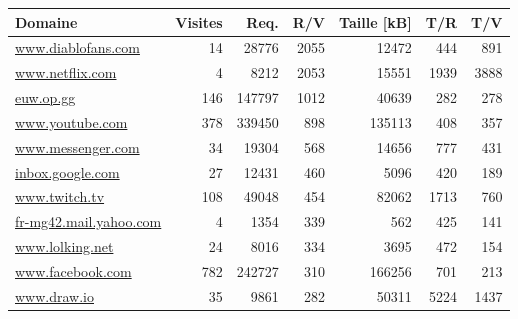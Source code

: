 \begin{table}[h]
\centering
\begin{tabular}{lrrrrrr}
\textbf{Domaine}          & \textbf{Visites} & \textbf{Req.} & \textbf{R/V} & \textbf{Taille [kB]} & \textbf{T/R} & \textbf{T/V} \\ \hline
\scriptsize \url{www.diablofans.com}        & 14             & 28776         & 2055                           & 12472         & 444                     & 891                       \\
\scriptsize \url{www.netflix.com}           & 4              & 8212          & 2053                           & 15551         & 1939                    & 3888                      \\
\scriptsize \url{euw.op.gg}                 & 146            & 147797        & 1012                           & 40639         & 282                     & 278                       \\
\scriptsize \url{www.youtube.com}           & 378            & 339450        & 898                            & 135113        & 408                     & 357                       \\
\scriptsize \url{www.messenger.com}         & 34             & 19304         & 568                            & 14656         & 777                     & 431                       \\
\scriptsize \url{inbox.google.com}          & 27             & 12431         & 460                            & 5096          & 420                     & 189                       \\
\scriptsize \url{www.twitch.tv}             & 108            & 49048         & 454                            & 82062         & 1713                    & 760                       \\
\scriptsize \url{fr-mg42.mail.yahoo.com}    & 4              & 1354          & 339                            & 562           & 425                     & 141                       \\
\scriptsize \url{www.lolking.net}           & 24             & 8016          & 334                            & 3695          & 472                     & 154                       \\
\scriptsize \url{www.facebook.com}          & 782            & 242727        & 310                            & 166256        & 701                     & 213                       \\
\scriptsize \url{www.draw.io}               & 35             & 9861          & 282                            & 50311         & 5224                    & 1437                      \\

\end{tabular}
\end{table}
